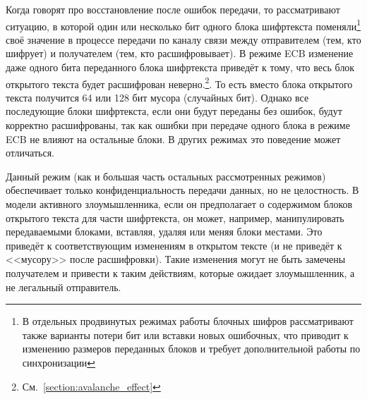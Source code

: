 Когда говорят про восстановление после ошибок передачи, то рассматривают ситуацию, в которой один или несколько бит одного блока шифртекста поменяли\footnote{В отдельных продвинутых режимах работы блочных шифров рассматривают также варианты потери бит или вставки новых ошибочных, что приводит к изменению размеров переданных блоков и требует дополнительной работы по синхронизации} своё значение в процессе передачи по каналу связи между отправителем (тем, кто шифрует) и получателем (тем, кто расшифровывает). В режиме ECB изменение даже одного бита переданного блока шифртекста приведёт к тому, что весь блок открытого текста будет расшифрован неверно.\footnote{См.~\autoref{section:avalanche_effect}}. То есть вместо блока открытого текста получится 64 или 128 бит мусора (случайных бит). Однако все последующие блоки шифртекста, если они будут переданы без ошибок, будут корректно расшифрованы, так как ошибки при передаче одного блока в режиме ECB не влияют на остальные блоки. В других режимах это поведение может отличаться.

Данный режим (как и большая часть остальных рассмотренных режимов) обеспечивает только конфиденциальность передачи данных, но не целостность. В модели активного злоумышленника, если он предполагает о содержимом блоков открытого текста для части шифртекста, он может, например, манипулировать передаваемыми блоками, вставляя, удаляя или меняя блоки местами. Это приведёт к соответствующим изменениям в открытом тексте (и не приведёт к <<мусору>> после расшифровки). Такие изменения могут не быть замечены получателем и привести к таким действиям, которые ожидает злоумышленник, а не легальный отправитель.
